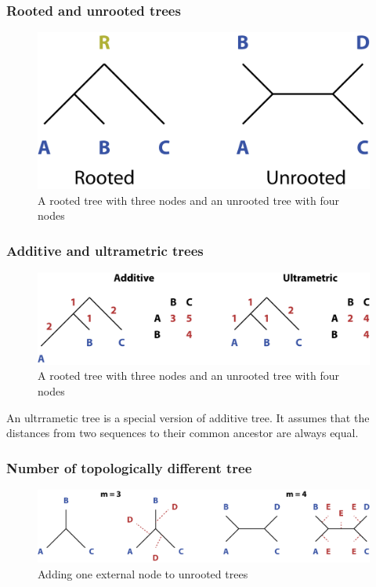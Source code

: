 %
%
\subsubsection*{Rooted and unrooted trees}
\begin{figure}[H]
  \centering
      \includegraphics[width=0.35 \textwidth]{fig09/root_unroot_trees.png}
  \caption{A rooted tree with three nodes and an unrooted tree with four nodes}
\end{figure}

%
%
\subsubsection*{Additive and ultrametric trees}
\begin{figure}[H]
  \centering
      \includegraphics[width=0.6 \textwidth]{fig09/additive_ultrametric.png}
  \caption{A rooted tree with three nodes and an unrooted tree with four nodes}
\end{figure}
An ultrrametic tree is a special version of additive tree. It assumes that the distances from two sequences to their common ancestor are always equal.

%
%
\subsubsection*{Number of topologically different tree}
\begin{figure}[H]
  \centering
      \includegraphics[width=0.7 \textwidth]{fig09/unroot_topology.png}
  \caption{Adding one external node to unrooted trees}
\end{figure}

